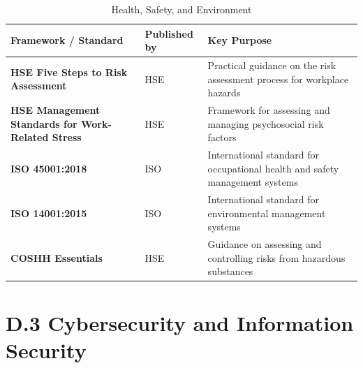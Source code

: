 \begin{table}[H]
  \centering
  \renewcommand{\arraystretch}{1.5}
  \begin{tabularx}{\textwidth}{ | >{\raggedright\arraybackslash}p{} 
								| >{\raggedright\arraybackslash}p{} 
                                | >{\raggedright\arraybackslash}X | }
    \hline
    \textbf{Framework / Standard} & \textbf{Published by} & \textbf{Key Purpose} \\
    \hline
    \textbf{HSE Five Steps to Risk Assessment} & HSE & Practical guidance on the risk assessment process for workplace hazards\\
    \hline
    \textbf{HSE Management Standards for Work-Related Stress} & HSE & Framework for assessing and managing psychosocial risk factors\\
    \hline
    \textbf{ISO 45001:2018} & ISO & International standard for occupational health and safety management systems\\
    \hline
    \textbf{ISO 14001:2015} & ISO & International standard for environmental management systems\\
    \hline
    \textbf{COSHH Essentials} & HSE & Guidance on assessing and controlling risks from hazardous substances\\
    \hline
  \end{tabularx}
  \caption{Health, Safety, and Environment}
\end{table}

\section*{D.3 Cybersecurity and Information Security}

